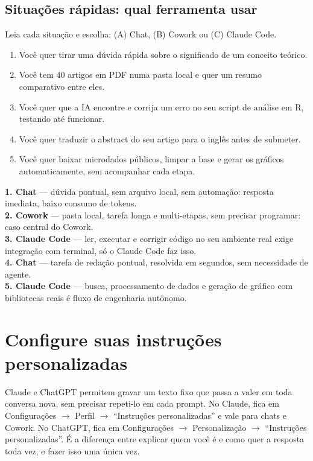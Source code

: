 \documentclass[11pt,a4paper]{article}
\newcommand{\iconBookmark}[1]{%
  \begin{tikzpicture}[baseline=-0.55ex]
    \draw[#1,line width=1pt,line join=round] (-0.11,0.15) -- (0.11,0.15) -- (0.11,-0.15) -- (0,-0.03) -- (-0.11,-0.15) -- cycle;
  \end{tikzpicture}}
\begin{document}
\subsection*{Situações rápidas: qual ferramenta usar}
\small
Leia cada situação e escolha: (A) Chat, (B) Cowork ou (C) Claude Code.
\begin{enumerate}[leftmargin=1.6em,itemsep=3pt]
  \item Você quer tirar uma dúvida rápida sobre o significado de um conceito teórico.
  \item Você tem 40 artigos em PDF numa pasta local e quer um resumo comparativo entre eles.
  \item Você quer que a IA encontre e corrija um erro no seu script de análise em R, testando até funcionar.
  \item Você quer traduzir o abstract do seu artigo para o inglês antes de submeter.
  \item Você quer baixar microdados públicos, limpar a base e gerar os gráficos automaticamente, sem acompanhar cada etapa.
\end{enumerate}
\begin{leitura}[title={\iconBookmark{white}\ \ Gabarito comentado}]
\footnotesize
\textbf{1. Chat} --- dúvida pontual, sem arquivo local, sem automação: resposta imediata, baixo consumo de tokens.\\
\textbf{2. Cowork} --- pasta local, tarefa longa e multi-etapas, sem precisar programar: caso central do Cowork.\\
\textbf{3. Claude Code} --- ler, executar e corrigir código no seu ambiente real exige integração com terminal, só o Claude Code faz isso.\\
\textbf{4. Chat} --- tarefa de redação pontual, resolvida em segundos, sem necessidade de agente.\\
\textbf{5. Claude Code} --- busca, processamento de dados e geração de gráfico com bibliotecas reais é fluxo de engenharia autônomo.
\end{leitura}

\section{Configure suas instruções personalizadas}
\small
Claude e ChatGPT permitem gravar um texto fixo que passa a valer em toda conversa nova, sem precisar repeti-lo em cada prompt. No Claude, fica em Configurações $\rightarrow$ Perfil $\rightarrow$ ``Instruções personalizadas'' e vale para chats e Cowork. No ChatGPT, fica em Configurações $\rightarrow$ Personalização $\rightarrow$ ``Instruções personalizadas''. É a diferença entre explicar quem você é e como quer a resposta toda vez, e fazer isso uma única vez.
\end{document}
